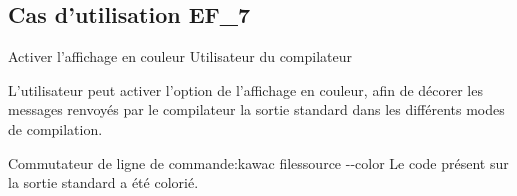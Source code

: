 \subsection{Cas d'utilisation EF\_7}
\fiche
{Activer l'affichage en couleur}          %
{Utilisateur du compilateur}                               %
{                                                %
   
  L'utilisateur peut activer l'option de l'affichage en couleur, afin de décorer les messages renvoyés par le compilateur la sortie standard dans les différents modes de compilation.   
}
{
  
}                                                %
{Commutateur de ligne de commande:kawac filessource -\hspace{0.1mm}-color}  %
{Le code présent sur la sortie standard a été colorié.}                       %
{                                                %
 
}{} %
{} %
